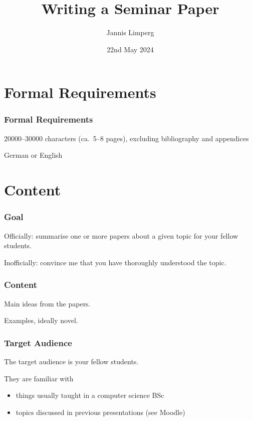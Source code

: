\documentclass[xetex]{beamer}
\begin{document}
\title{Writing a Seminar Paper}
\author{Jannis Limperg}
\date{22nd May 2024}

\begin{frame}
  \maketitle
\end{frame}

\begin{frame}
  \tableofcontents[hideallsubsections]
\end{frame}

\section{Formal Requirements}

\begin{frame}
  \frametitle{Formal Requirements}

  20000--30000 characters (ca.\ 5--8 pages), excluding bibliography and appendices

  \medskip
  \pause

  German or English
\end{frame}

\section{Content}

\begin{frame}
  \frametitle{Goal}

  Officially: summarise one or more papers about a given topic for your fellow students.

  \medskip
  \pause

  Inofficially: convince me that you have thoroughly understood the topic.
\end{frame}

\begin{frame}
  \frametitle{Content}

  Main ideas from the papers.

  \medskip
  \pause

  Examples, ideally novel.
\end{frame}

\begin{frame}
  \frametitle{Target Audience}

  The target audience is your fellow students.

  \medskip
  \pause

  They are familiar with
  \begin{itemize}
    \item things usually taught in a computer science BSc
    \item topics discussed in previous presentations (see Moodle)
  \end{itemize}
\end{frame}
\end{document}
